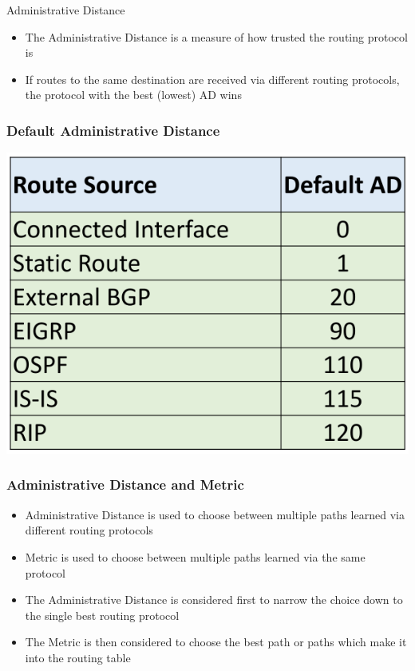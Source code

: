 \documentclass[pdflatex,compress,mathserif]{beamer}
\begin{document}
\begin{frame}{Administrative Distance}
	\begin{itemize}
		\item The Administrative Distance is a measure of how trusted the routing
protocol is
		\item If routes to the same destination are received via different routing
protocols, the protocol with the best (lowest) AD wins
	\end{itemize}
\end{frame}

\begin{frame}
	\frametitle{Default Administrative Distance}
	\begin{center}
		\includegraphics[width=0.7\linewidth]{img/img28}
	\end{center}
\end{frame}

\begin{frame}
	\frametitle{Administrative Distance and Metric}
	\begin{itemize}
		\item Administrative Distance is used to choose between multiple paths
learned via different routing protocols
		\item Metric is used to choose between multiple paths learned via the same
protocol
		\item The Administrative Distance is considered first to narrow the choice
down to the single best routing protocol
		\item The Metric is then considered to choose the best path or paths which
make it into the routing table
	\end{itemize}
\end{frame}
\end{document}
